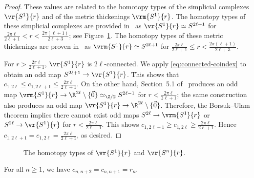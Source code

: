 \documentclass[11pt, reqno, english]{amsart}
\begin{document}
\begin{proof}
These values are related to the homotopy types of the simplicial complexes $\vr{S^1}{r}$ and of the metric thickenings $\vrm{S^1}{r}$.
The homotopy types of these simplicial complexes are provided in~\cite{AA-VRS1} as $\vr{S^1}{r}\simeq S^{2\ell+1}$ for $\frac{2\pi \ell}{2\ell+1}<r<\frac{2\pi(\ell+1)}{2\ell+3}$; see Figure~\ref{fig:VRSn}.
The homotopy types of these metric thickenings are proven in~\cite{moyVRmS1} as $\vrm{S^1}{r}\simeq %
S^{2\ell+1}$ for $\frac{2\pi \ell}{2\ell+1}\le r<\frac{2\pi(\ell+1)}{2\ell+3}$.

For $r>\tfrac{2\pi \ell}{2\ell+1}$, $\vr{S^1}{r}$ is $2\ell$-connected.
We apply \eqref{eq:connected-coindex} to obtain an odd map $S^{2\ell+1}\to \vr{S^1}{r}$.
This shows that $c_{1,2\ell}\le c_{1,2\ell+1}\le\tfrac{2\pi \ell}{2\ell+1}$.
On the other hand, Section~5.1 of~\cite{ABF} produces an odd map $\vrm{S^1}{r}\to \R^{2\ell}\setminus\{\vec{0}\}\simeq_{\Z/2} S^{2\ell-1}$ for $r<\frac{2\pi \ell}{2\ell+1}$; the same construction also produces an odd map $\vr{S^1}{r}\to \R^{2\ell}\setminus\{\vec{0}\}$.
Therefore, the Borsuk--Ulam theorem implies there cannot exist odd maps $S^{2\ell}\to\vrm{S^1}{r}$ or $S^{2\ell}\to\vr{S^1}{r}$ for $r<\frac{2\pi \ell}{2\ell+1}$.
This shows $c_{1,2\ell+1}\ge c_{1,2\ell}\ge\tfrac{2\pi \ell}{2\ell+1}$.
Hence $c_{1,2\ell+1}=c_{1,2\ell}=\tfrac{2\pi \ell}{2\ell+1}$, as desired.
\end{proof}


\begin{figure}[h]
\centering

\caption{The homotopy types of $\vr{S^1}{r}$ and $\vr{S^n}{r}$.}
\label{fig:VRSn}
\end{figure}

\begin{theorem}
\label{thm:c-n-n+1}
For all $n\ge 1$, we have $c_{n,n+2} = c_{n,n+1}=r_n$.
\end{theorem}
\end{document}
